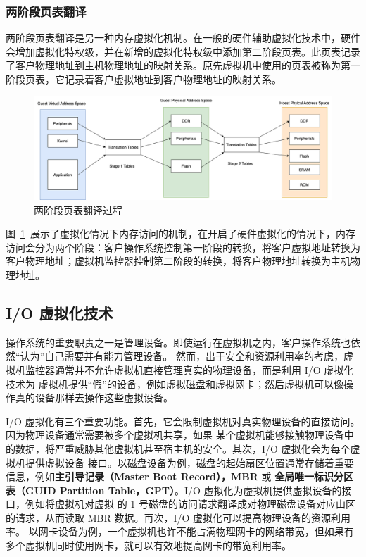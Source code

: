 \subsubsection{两阶段页表翻译}
两阶段页表翻译是另一种内存虚拟化机制。在一般的硬件辅助虚拟化技术中，硬件会增加虚拟化特权级，并在新增的虚拟化特权级中添加第二阶段页表。此页表记录了客户物理地址到主机物理地址的映射关系。原先虚拟机中使用的页表被称为第一阶段页表，它记录着客户虚拟地址到客户物理地址的映射关系。

\begin{figure}[]
    \centering
    \includegraphics[width=1\textwidth]{thesis-images/two-stage-translation.png}
    \caption{两阶段页表翻译过程}\label{fig:two-stage-translation}
\end{figure}

图~\ref{fig:two-stage-translation}~展示了虚拟化情况下内存访问的机制，在开启了硬件虚拟化的情况下，内存访问会分为两个阶段：客户操作系统控制第一阶段的转换，将客户虚拟地址转换为客户物理地址；虚拟机监控器控制第二阶段的转换，将客户物理地址转换为主机物理地址。\cite{陈海波2019现代操作系统}

\subsection{I/O 虚拟化技术}
操作系统的重要职责之一是管理设备。即使运行在虚拟机之内，客户操作系统也依然“认为”自己需要并有能力管理设备。
然而，出于安全和资源利用率的考虑，虚拟机监控器通常并不允许虚拟机直接管理真实的物理设备，而是利用 I/O 虚拟化技术为
虚拟机提供“假”的设备，例如虚拟磁盘和虚拟网卡；然后虚拟机可以像操作真的设备那样去操作这些虚拟设备。\cite{陈海波2019现代操作系统}

I/O 虚拟化有三个重要功能。首先，它会限制虚拟机对真实物理设备的直接访问。因为物理设备通常需要被多个虚拟机共享，如果
某个虚拟机能够接触物理设备中的数据，将严重威胁其他虚拟机甚至宿主机的安全。其次，I/O 虚拟化会为每个虚拟机提供虚拟设备
接口。以磁盘设备为例，磁盘的起始扇区位置通常存储着重要信息，例如\textbf{主引导记录（Master Boot Record），MBR} 或 
\textbf{全局唯一标识分区表（GUID Partition Table，GPT）}。I/O 虚拟化为虚拟机提供虚拟设备的接口，例如将虚拟机对虚拟
的 1 号磁盘的访问请求翻译成对物理磁盘设备对应山区的请求，从而读取 MBR 数据。再次，I/O 虚拟化可以提高物理设备的资源利用率。
以网卡设备为例，一个虚拟机也许不能占满物理网卡的网络带宽，但如果有多个虚拟机同时使用网卡，就可以有效地提高网卡的带宽利用率。\cite{陈海波2019现代操作系统}

